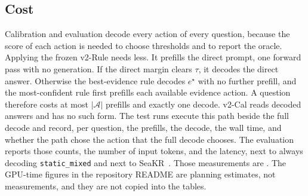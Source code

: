 \documentclass[sigconf,anonymous,review]{acmart}
\newcommand{\ph}{\revhl{X.XX}}
\begin{document}
\subsection{Cost}
\label{sec:cost}
Calibration and evaluation decode every action of every question, because the score of each action is needed to choose thresholds and to report the oracle.
Applying the frozen v2-Rule needs less.
It prefills the direct prompt, one forward pass with no generation.
If the direct margin clears $\tau$, it decodes the direct answer.
Otherwise the best-evidence rule decodes $e^{\star}$ with no further prefill, and the most-confident rule first prefills each available evidence action.
A question therefore costs at most $|\mathcal{A}|$ prefills and exactly one decode.
v2-Cal reads decoded answers and has no such form.
The test runs execute this path beside the full decode and record, per question, the prefills, the decode, the wall time, and whether the path chose the action that the full decode chooses.
The evaluation reports those counts, the number of input tokens, and the latency, next to always decoding \texttt{static\_mixed} and next to SeaKR~\cite{yao2025seakr}.
Those measurements are \ph{}.
The GPU-time figures in the repository README are planning estimates, not measurements, and they are not copied into the tables.






\appendix

\end{document}
